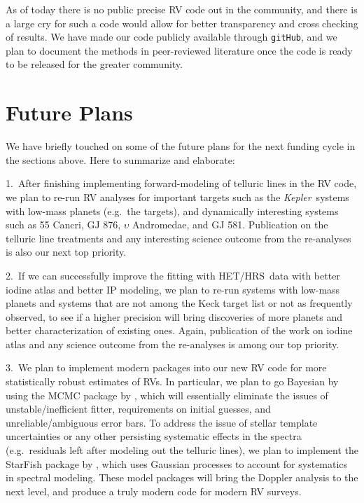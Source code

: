 \documentclass[12pt]{article}
\def\kepler{{\it Kepler}}
\def\hrs{HET/HRS}
\begin{document}
As of today there is no public precise RV code out in the community,
and there is a large cry for such a code would allow for better
transparency and cross checking of results. We have made our code
publicly available through {\tt gitHub}, and we plan to document the methods
in peer-reviewed literature once the code is ready to be released for
the greater community.


\vspace{-10pt}
\section{Future Plans}
\vspace{-5pt}

We have briefly touched on some of the future plans for the next
funding cycle in the sections above. Here to summarize and elaborate:

1.\ After finishing implementing forward-modeling of telluric lines in
the RV code, we plan to re-run RV analyses for important targets such
as the \kepler\ systems with low-mass planets (e.g.\ the
\citealt{Marcy2014} targets), and dynamically interesting systems such
as 55 Cancri, GJ 876, $\upsilon$ Andromedae, and GJ 581. Publication
on the telluric line treatments and any interesting science outcome
from the re-analyses is also our next top priority.

2.\ If we can successfully improve the fitting with \hrs\ data with
better iodine atlas and better IP modeling, we plan to re-run systems
with low-mass planets and systems that are not among the Keck target
list or not as frequently observed, to see if a higher precision will
bring discoveries of more planets and better characterization of
existing ones. Again, publication of the work on iodine atlas and any
science outcome from the re-analyses is among our top priority.

3.\ We plan to implement modern packages into our new RV code for more
statistically robust estimates of RVs. In particular, we plan to go
Bayesian by using the MCMC package by \cite{emcee}, which will
essentially eliminate the issues of unstable/inefficient fitter,
requirements on initial guesses, and unreliable/ambiguous error
bars. To address the issue of stellar template uncertainties or any
other persisting systematic effects in the spectra (e.g.\ residuals
left after modeling out the telluric lines), we plan to implement the
StarFish package by \cite{starfish}, which uses Gaussian processes to
account for systematics in spectral modeling. These model packages
will bring the Doppler analysis to the next level, and produce a truly
modern code for modern RV surveys.
\end{document}
